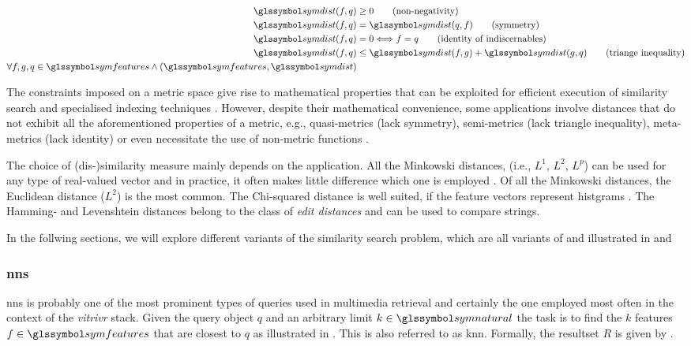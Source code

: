 \begin{align}
  \label{eq:metric}
   \symdist(f,q) &\geq 0                           \tag{non-negativity} \\
   \symdist(f,q) &= \symdist(q,f)                    \tag{symmetry}\\
   \symdist(f,q) &= 0 \Longleftrightarrow f = q    \tag{identity of indiscernables}\\
   \symdist(f,q) &\leq  \symdist(f,g) +  \symdist(g,q)   \tag{triange inequality}\\
   \forall f,g,q \in \symfeatures \wedge (\symfeatures, \symdist) \nonumber
\end{align}

The constraints imposed on a metric space give rise to mathematical properties that can be exploited for efficient execution of similarity search and specialised indexing techniques \cite{Zezula:2006Similarity}. However, despite their mathematical convenience, some applications involve distances that do not exhibit all the aforementioned properties of a metric, e.g., quasi-metrics (lack symmetry), semi-metrics (lack triangle inequality), meta-metrics (lack identity) \cite{Zezula:2006Similarity} or even necessitate the use of non-metric functions \cite{Skopal:2011Nonmetric}.

The choice of (dis-)similarity measure mainly depends on the application. All the Minkowski distances, (i.e., $L^1$, $L^2$, $L^p$) can be used for any type of real-valued vector and in practice, it often makes little difference which one is employed \cite{Rossetto:2018Multi}. Of all the Minkowski distances, the Euclidean distance ($L^2$) is the most common. The Chi-squared distance is well suited, if the feature vectors represent histgrams \cite{Pele:2010Quadratic}. The Hamming- and Levenshtein distances belong to the class of \emph{edit distances} and can be used to compare strings.

In the follwing sections, we will explore different variants of the similarity search problem, which are all variants of  and illustrated in  and 

\subsubsection{\texorpdfstring{\acrfull{nns}}{Nearest Neighbour Search (NNS)}}

\acrshort{nns} is probably one of the most prominent types of queries used in multimedia retrieval and certainly the one employed most often in the context of the \emph{vitrivr} \cite{Rossetto:2016vitrivr,Gasser:2019Multimodal} stack. Given the query object $q$ and an arbitrary limit $k \in \symnatural$ the task is to find the $k$ features $f \in \symfeatures$ that are closest to $q$ as illustrated in . This is also referred to as \acrfull{knn}. Formally, the resultset $R$ is given by .

